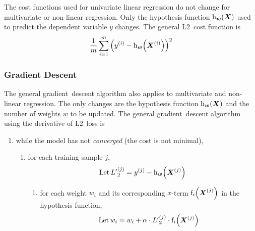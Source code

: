 The cost functions used for univariate linear regression do not change for multivariate or non-linear regression.
Only the hypothesis function \( \function[_{\boldsymbol{w}}]{h}{\boldsymbol{X}} \) used to predict the dependent variable \( y \) changes.
The general L2~cost function is
\begin{equation*}
  \frac{1}{m} \sum_{i=1}^{m} \left( y^{(i)} - \function[_{\boldsymbol{w}}]{h}{\boldsymbol{X}^{(i)}} \right)^{2}
\end{equation*}

\subsubsection{Gradient Descent}

The general gradient~descent algorithm also applies to multivariate and non-linear regression.
The only changes are the hypothesis function \( \function[_{\boldsymbol{w}}]{h}{\boldsymbol{X}} \) and the number of weights \( w \) to be updated.
The general gradient~descent algorithm using the derivative of L2~loss is
\begin{enumerate}
  \item while the model has not \emph{converged} (the cost is not minimal),
  \begin{enumerate}
    \item for each training sample \( j \),
    \begin{equation*}
      \text{Let}\, {L^{\prime}}_{2}^{(j)} = y^{(j)} - \function[_{\boldsymbol{w}}]{h}{\boldsymbol{X}^{(j)}} \\
    \end{equation*}
    \begin{enumerate}
      \item for each weight \( w_{i} \) and its corresponding \( x \)-term \( \function[_{i}]{f}{\boldsymbol{X}^{(j)}} \) in the hypothesis function,
      \begin{equation*}
        \text{Let}\, w_{i} = w_{i} + \alpha \cdot  {L^{\prime}}_{2}^{(j)} \cdot \function[_{i}]{f}{\boldsymbol{X}^{(j)}}
      \end{equation*}
    \end{enumerate}
  \end{enumerate}
\end{enumerate}
